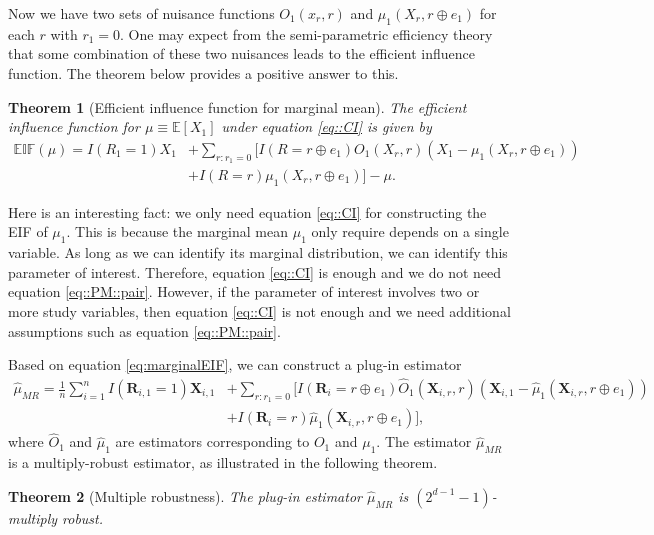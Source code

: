 \documentclass[aos, preprint]{imsart}
\theoremstyle{plain}
\newtheorem{theorem}{Theorem}[section]
\theoremstyle{definition}
\let\hat\widehat
\newcommand{\E}{\mbox{$\mathbb{E}$}}
\newcommand{\bX}{\mathbf{X}}
\newcommand{\bR}{\mathbf{R}}
\newcommand{\EIF}{\mathbb{EIF}}
\begin{document}
Now we have two sets of nuisance functions $O_1(x_{r}, r)$
and $\mu_1(X_r,r\oplus e_1)$ for each $r$ with $r_1 = 0$. 
One may expect from the semi-parametric efficiency theory that
some combination of these two nuisances leads to the efficient influence function.
The theorem below provides a positive answer to this.




\begin{theorem}[Efficient influence function for marginal mean]\label{thm::EIF}
		The efficient influence function for $\mu\equiv\E[X_1]$ under equation \eqref{eq::CI} is given by
		\begin{equation}
		\begin{aligned}
			\EIF(\mu) = I(R_1=1)X_1  
			 &+ \sum_{r:r_1=0} \biggr[I(R=r\oplus e_1) O_1(X_r,r) (X_1 - \mu_1(X_r,r\oplus e_1)) \\
			&+ I(R=r)  \mu_1(X_r,r\oplus e_1)\biggr] - \mu. 
		\end{aligned}
		\label{eq:marginalEIF}
		\end{equation}
	\end{theorem}
	
	
Here is an interesting fact: we only need equation \eqref{eq::CI} for constructing the EIF of $\mu_1$.
This is because the marginal mean $\mu_1$ only require 
depends on a single variable. As long as we can identify its marginal distribution,
we can identify this parameter of interest.
Therefore, equation \eqref{eq::CI} is enough and we do not need equation \eqref{eq::PM::pair}.
However, if the parameter of interest involves two or more study
variables, then equation \eqref{eq::CI} is not enough and we need additional assumptions  such as equation \eqref{eq::PM::pair}. 


Based on equation \eqref{eq:marginalEIF}, 
we can construct a plug-in estimator
\begin{align*}
\hat \mu_{MR} = \frac{1}{n}\sum_{i=1}^n I(\bR_{i,1}=1)\bX_{i,1}  
		 &+ \sum_{r:r_1=0} \biggr[I(\bR_i=r\oplus e_1) \hat O_1(\bX_{i,r},r) (\bX_{i,1} - \hat \mu_1(\bX_{i,r},r\oplus e_1)) \\
			&+ I(\bR_i=r)  \hat \mu_1(\bX_{i,r},r\oplus e_1)\biggr],
\end{align*}
where $\hat O_1$ and $\hat \mu_1$ are estimators corresponding to $O_1$ and $\mu_1$. 
The estimator $\hat \mu_{MR}$
is a multiply-robust estimator, as illustrated in the following theorem. 

	\begin{theorem}[Multiple robustness]\label{thm::MR}
		The plug-in estimator $\hat \mu_{MR}$ is $(2^{d-1}-1)$-multiply robust.
	\end{theorem}
	
\end{document}
